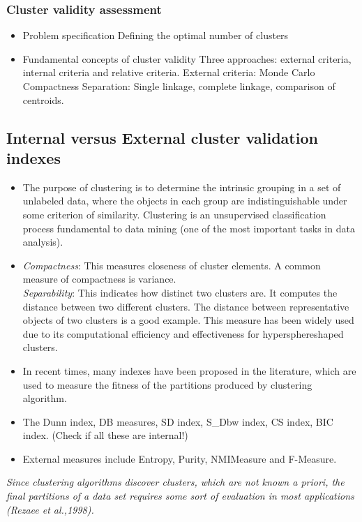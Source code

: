\documentclass[a4paper,10pt]{article}
\begin{document}
\subsubsection{Cluster validity assessment}
\begin{itemize}
	\item Problem specification
		\subitem Defining the optimal number of clusters
	\item Fundamental concepts of cluster validity
		\subitem Three approaches: external criteria, internal criteria and relative criteria.
			\subsubitem External criteria: Monde Carlo
		\subitem Compactness
		\subitem Separation: Single linkage, complete linkage, comparison of centroids.
\end{itemize}

\subsection{Internal versus External cluster validation indexes}
\begin{itemize}
	\item The purpose of clustering is to determine the intrinsic grouping in a set of unlabeled data, where the objects in each group are indistinguishable under some criterion of similarity. Clustering is an unsupervised classification process fundamental to data mining (one of the most important tasks in data analysis).
	
	\item \textit{Compactness}: This measures closeness of cluster elements. A common measure of compactness is variance.\\
	\textit{Separability}: This indicates how distinct two clusters are. It computes the distance between two different clusters. The distance between representative objects of two clusters is a good example. This measure has been widely used due to its computational efficiency and effectiveness for hypersphereshaped clusters.
	\item In recent times, many indexes have been proposed in the literature, which are used to measure the fitness of the partitions produced by clustering algorithm.
	\item The Dunn index, DB measures, SD index, S\_Dbw index, CS index, BIC index. (Check if all these are internal!)
	\item External measures include Entropy, Purity, NMIMeasure and F-Measure.
\end{itemize}
\textit{Since clustering algorithms discover clusters, which are not known a priori, the final partitions of a data set requires some sort of evaluation in most applications (Rezaee et al.,1998).}
\end{document}
